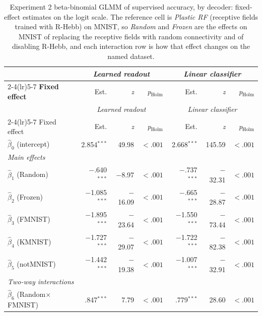 \footnotesize{
\setlength{\tabcolsep}{4pt}
\begin{longtable}{l rrr rrr}
    \caption{Experiment 2 beta-binomial GLMM of supervised accuracy, by decoder: fixed-effect
    estimates on the logit scale. The reference cell is \textit{Plastic RF} (receptive
    fields trained with R-Hebb) on MNIST, so \textit{Random} and \textit{Frozen} are the effects on
    MNIST of replacing the receptive fields with random connectivity and of disabling
    R-Hebb, and each interaction row is how that effect changes on the named
    dataset.\label{tab:glmm_phase2}}\\
    \toprule
    & \multicolumn{3}{c}{\textit{Learned readout}} & \multicolumn{3}{c}{\textit{Linear classifier}}\\
    \cmidrule(lr){2-4}\cmidrule(lr){5-7}
    \textbf{Fixed effect} & Est. & \textit{z} & \textit{p}$_{\text{Holm}}$ & Est. & \textit{z} & \textit{p}$_{\text{Holm}}$\\
    \midrule
    \endfirsthead
    \toprule
    & \multicolumn{3}{c}{\textit{Learned readout}} & \multicolumn{3}{c}{\textit{Linear classifier}}\\
    \cmidrule(lr){2-4}\cmidrule(lr){5-7}
    Fixed effect & Est. & \textit{z} & \textit{p}$_{\text{Holm}}$ & Est. & \textit{z} & \textit{p}$_{\text{Holm}}$\\
    \midrule
    \endhead
    $\hat{\beta}_0$ (intercept) & 2.854$^{***}$ & 49.98 & $<.001$ & 2.668$^{***}$ & 145.59 & $<.001$\\
    \multicolumn{7}{l}{\textit{Main effects}}\\
    $\hat{\beta}_{1}$ (Random) & $-$.640$^{***}$ & $-$8.97 & $<.001$ & $-$.737$^{***}$ & $-$32.31 & $<.001$\\
    $\hat{\beta}_{2}$ (Frozen) & $-$1.085$^{***}$ & $-$16.09 & $<.001$ & $-$.665$^{***}$ & $-$28.87 & $<.001$\\
    $\hat{\beta}_{3}$ (FMNIST) & $-$1.895$^{***}$ & $-$23.64 & $<.001$ & $-$1.550$^{***}$ & $-$73.44 & $<.001$\\
    $\hat{\beta}_{4}$ (KMNIST) & $-$1.727$^{***}$ & $-$29.07 & $<.001$ & $-$1.722$^{***}$ & $-$82.38 & $<.001$\\
    $\hat{\beta}_{5}$ (notMNIST) & $-$1.442$^{***}$ & $-$19.38 & $<.001$ & $-$1.007$^{***}$ & $-$32.91 & $<.001$\\
    \multicolumn{7}{l}{\textit{Two-way interactions}}\\
    $\hat{\beta}_{6}$ (Random$\times$FMNIST) & .847$^{***}$ & 7.79 & $<.001$ & .779$^{***}$ & 28.60 & $<.001$\\

\end{longtable}}
